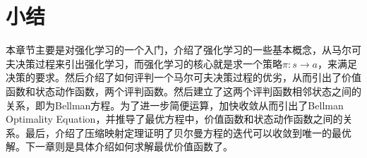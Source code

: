 \documentclass[a4paper]{article}
\begin{document}
\section{小结}
本章节主要是对强化学习的一个入门，介绍了强化学习的一些基本概念，从马尔可夫决策过程来引出强化学习，而强化学习的核心就是求一个策略$\pi:s\to a$，来满足决策的要求。然后介绍了如何评判一个马尔可夫决策过程的优劣，从而引出了价值函数和状态动作函数，两个评判函数。然后建立了这两个评判函数相邻状态之间的关系，即为Bellman方程。为了进一步简便运算，加快收敛从而引出了Bellman Optimality Equation，并推导了最优方程中，价值函数和状态动作函数之间的关系。最后，介绍了压缩映射定理证明了贝尔曼方程的迭代可以收敛到唯一的最优解。下一章则是具体介绍如何求解最优价值函数了。
\end{document}
